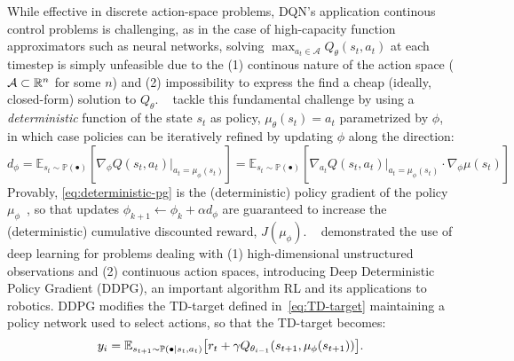 While effective in discrete action-space problems, DQN's application continous control problems is challenging, as in the case of high-capacity function approximators such as neural networks, solving \( \max_{a_t \in \mathcal A} Q_\theta(s_t, a_t) \) at each timestep is simply unfeasible due to the (1) continous nature of the action space (\( \mathcal A \subset \mathbb R^n \) for some \( n \)) and (2) impossibility to express the find a cheap (ideally, closed-form) solution to \( Q_\theta \).
~\citet{silverDeterministicPolicyGradient2014} tackle this fundamental challenge by using a \emph{deterministic} function of the state \( s_t \) as policy, \( \mu_\theta(s_t) = a_t \) parametrized by \( \phi \), in which case policies can be iteratively refined by updating \( \phi \) along the direction:
\begin{equation}\label{eq:deterministic-pg}
    d_\phi = \mathbb E_{s_t \sim \mathbb P (\bullet)} \left[ \nabla_\phi Q(s_t, a_t)\vert_{a_t = \mu_\phi(s_t)} \right] = \mathbb E_{s_t \sim \mathbb P(\bullet)} \left[ \nabla_{a_t} Q(s_t, a_t) \vert_{a_t = \mu_\phi(s_t)} \cdot \nabla_\phi \mu(s_t) \right]
\end{equation}
Provably, \ref{eq:deterministic-pg} is the (deterministic) policy gradient of the policy \(\mu_\phi \)~\citep{silverDeterministicPolicyGradient2014}, so that updates \( \phi_{k+1}\leftarrow \phi_k + \alpha d_\phi \) are guaranteed to increase the (deterministic) cumulative discounted reward, \( J(\mu_\phi) \).
~\citet{lillicrapContinuousControlDeep2019} demonstrated the use of deep learning for problems dealing with (1) high-dimensional unstructured observations and (2) continuous action spaces, introducing Deep Deterministic Policy Gradient (DDPG), an important algorithm RL and its applications to robotics.
DDPG modifies the TD-target defined in~\ref{eq:TD-target} maintaining a policy network used to select actions, so that the TD-target becomes:
\begin{equation}\label{eq:TD-target-ddpg}
y_i = \mathbb E_{s_{t+1} \sim \mathbb P(\bullet \vert s_t, a_t)} \big[ r_t + \gamma Q_{\theta_{i-1}} (s_{t+1}, \mu_\phi(s_{t+1})) \big] .
\end{equation}

